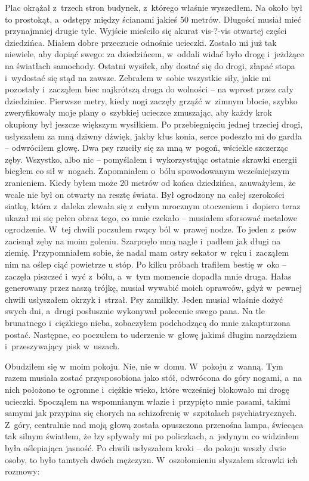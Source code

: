 Plac okrążał z~trzech stron budynek, z~którego właśnie wyszedłem. Na około był to prostokąt, a~odstępy między ścianami jakieś 50 metrów. Długości musiał mieć przynajmniej drugie tyle. Wyjście mieściło się akurat vis-?-vis otwartej części dziedzińca. Miałem dobre przeczucie odnośnie ucieczki. Zostało mi już tak niewiele, aby dopiąć swego: za dziedzińcem, w~oddali widać było drogę i~jeżdżące na światłach samochody. Ostatni wysiłek, aby dostać się do drogi, złapać stopa i~wydostać się stąd na zawsze. Zebrałem w~sobie wszystkie siły, jakie mi pozostały i~zacząłem biec najkrótszą droga do wolności -- na wprost przez cały dziedziniec. Pierwsze metry, kiedy nogi zaczęły grząźć w~zimnym błocie, szybko zweryfikowały moje plany o~szybkiej ucieczce zmuszając, aby każdy krok okupiony był jeszcze większym wysiłkiem. Po przebiegnięciu jednej trzeciej drogi, usłyszałem za mną dziwny dźwięk, jakby kłus konia, serce podeszło mi do gardła -- odwróciłem głowę. Dwa psy rzuciły się za mną w~pogoń, wściekle szczerząc zęby. Wszystko, albo nic -- pomyślałem i~wykorzystując ostatnie skrawki energii biegłem co sił w~nogach. Zapomniałem o~bólu spowodowanym wcześniejszym zranieniem. Kiedy byłem może 20 metrów od końca dziedzińca, zauważyłem, że wcale nie był on otwarty na resztę świata. Był ogrodzony na całej szerokości siatką, która z~daleka zlewała się z~całym mrocznym otoczeniem i~dopiero teraz ukazał mi się pełen obraz tego, co mnie czekało -- musiałem sforsować metalowe ogrodzenie. W~tej chwili poczułem rwący ból w~prawej nodze. To jeden z~psów zacisnął zęby na moim goleniu. Szarpnęło mną nagle i~padłem jak długi na ziemię. Przypomniałem sobie, że nadal mam ostry sekator w~ręku i~zacząłem nim na oślep ciąć powietrze u stóp. Po kilku próbach trafiłem bestię w~oko -- zaczęła piszczeć i~wyć z~bólu, a~w~tym momencie dopadła mnie druga. Hałas generowany przez naszą trójkę, musiał wywabić moich oprawców, gdyż w~pewnej chwili usłyszałem okrzyk i~strzał. Psy zamilkły. Jeden musiał właśnie dożyć swych dni, a~drugi posłusznie wykonywał polecenie swego pana. Na tle brunatnego i~ciężkiego nieba, zobaczyłem podchodzącą do mnie zakapturzona postać. Następne, co poczułem to uderzenie w~głowę jakimś długim narzędziem i~przeszywający pisk w~uszach. 

Obudziłem się w~moim pokoju. Nie, nie w~domu. W~pokoju z~wanną. Tym razem musiała zostać przysposobiona jako stół, odwrócona do góry nogami, a~na nich położono te ogromne i~ciężkie wieko, które wcześniej blokowało mi drogę ucieczki. Spocząłem na wspomnianym włazie i~przypięto mnie pasami, takimi samymi jak przypina się chorych na schizofrenię w~szpitalach psychiatrycznych. Z~góry, centralnie nad moją głową została opuszczona przenośna lampa, świecąca tak silnym światłem, że łzy spływały mi po policzkach, a~jedynym co widziałem była oślepiająca jasność. Po chwili usłyszałem kroki -- do pokoju weszły dwie osoby, to było tamtych dwóch mężczyzn. W~oszołomieniu słyszałem skrawki ich rozmowy:

